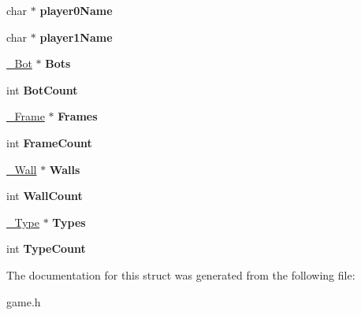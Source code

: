 \begin{DoxyCompactItemize}
\item 
\hypertarget{structConnection_a6199df3cf201346b6e1d664791bad969}{
char $\ast$ {\bfseries player0Name}}
\label{structConnection_a6199df3cf201346b6e1d664791bad969}

\item 
\hypertarget{structConnection_aca48a06e1bff67f7e6796e3064ab29ef}{
char $\ast$ {\bfseries player1Name}}
\label{structConnection_aca48a06e1bff67f7e6796e3064ab29ef}

\item 
\hypertarget{structConnection_a72a03a6f80a270ad1e30a8cc00f82954}{
\hyperlink{struct__Bot}{\_\-Bot} $\ast$ {\bfseries Bots}}
\label{structConnection_a72a03a6f80a270ad1e30a8cc00f82954}

\item 
\hypertarget{structConnection_ab8b37a7a1b87d6c61a1736842d250342}{
int {\bfseries BotCount}}
\label{structConnection_ab8b37a7a1b87d6c61a1736842d250342}

\item 
\hypertarget{structConnection_ae65ec3fec853941f2138f0f2a0902d19}{
\hyperlink{struct__Frame}{\_\-Frame} $\ast$ {\bfseries Frames}}
\label{structConnection_ae65ec3fec853941f2138f0f2a0902d19}

\item 
\hypertarget{structConnection_a589e0384f35b61f26fee5d184810439e}{
int {\bfseries FrameCount}}
\label{structConnection_a589e0384f35b61f26fee5d184810439e}

\item 
\hypertarget{structConnection_a81490983ad40f32c911f16153d8133d7}{
\hyperlink{struct__Wall}{\_\-Wall} $\ast$ {\bfseries Walls}}
\label{structConnection_a81490983ad40f32c911f16153d8133d7}

\item 
\hypertarget{structConnection_a2a797a8b50d577633c99529b4faeb1a3}{
int {\bfseries WallCount}}
\label{structConnection_a2a797a8b50d577633c99529b4faeb1a3}

\item 
\hypertarget{structConnection_a6f2a2b2fc4e0e04d1154a2384d815609}{
\hyperlink{struct__Type}{\_\-Type} $\ast$ {\bfseries Types}}
\label{structConnection_a6f2a2b2fc4e0e04d1154a2384d815609}

\item 
\hypertarget{structConnection_a676cbda78a450c88795f1df5e6ce4d67}{
int {\bfseries TypeCount}}
\label{structConnection_a676cbda78a450c88795f1df5e6ce4d67}

\end{DoxyCompactItemize}


The documentation for this struct was generated from the following file:\begin{DoxyCompactItemize}
\item 
game.h\end{DoxyCompactItemize}
